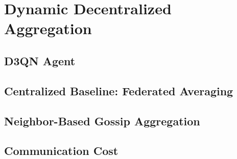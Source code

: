 
\chapter{Dynamic Decentralized Aggregation}
\label{chap:decentralized-aggregation}


\section{D3QN Agent}
\label{sec:d3qn-agent}

\section{Centralized Baseline: Federated Averaging}
\label{sec:fedavg}

\section{Neighbor-Based Gossip Aggregation}
\label{sec:gossip}

\section{Communication Cost}
\label{sec:communication-cost}

\endinput

